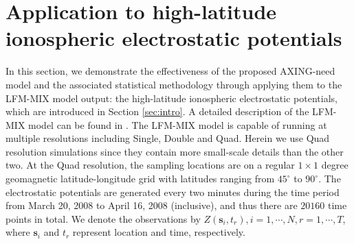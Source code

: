 \documentclass[aoas,preprint]{imsart}
\numberwithin{equation}{section}
\theoremstyle{plain}
\begin{document}
\section{Application to high-latitude ionospheric electrostatic potentials}\label{sec:app}


In this section, we demonstrate the effectiveness of the proposed AXING-need model and the associated statistical methodology through applying them to the LFM-MIX model output: the high-latitude ionospheric electrostatic potentials, which are introduced in Section \ref{sec:intro}. A detailed description of the LFM-MIX model can be found in \citet{Wiltberger-16}.
The LFM-MIX model is capable of running at multiple resolutions including Single, Double and Quad. Herein we use Quad resolution simulations since they contain more small-scale details than the other two.  At the Quad resolution, the sampling locations are on a regular $1\times 1$ degree geomagnetic latitude-longitude grid with latitudes ranging from $45^\circ$ to $90^\circ$. The electrostatic potentials are generated every two minutes during the time period from March 20, 2008 to April 16, 2008 (inclusive), and thus there are $20160$ time points in total. We denote the observations by $Z(\mathbf{s}_i, t_r), i=1, \cdots, N, r=1, \cdots, T$, where $\mathbf{s}_i$ and $t_r$ represent location and time, respectively.
\end{document}
